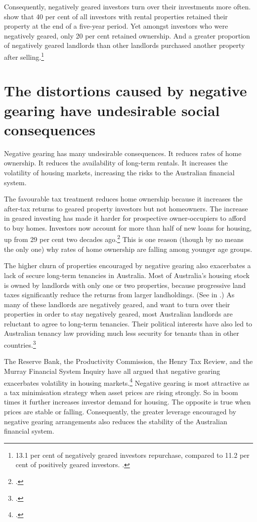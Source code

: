 Consequently, negatively geared investors turn over their investments more often. 
\textcite[][28]{WoodOng2010} show that 40 per cent of all investors with rental properties retained their property at the end of a five-year period.  
Yet amongst investors who were negatively geared, only 20 per cent retained ownership. And a greater proportion of negatively geared landlords than other landlords purchased another property after selling.\footnote{13.1 per cent of negatively geared investors repurchase, compared to 11.2 per cent of positively geared investors. \textcite[][28]{WoodOng2010}.}  

\section{The distortions caused by negative gearing have undesirable social consequences}
Negative gearing has many undesirable consequences. It reduces rates of home ownership. 
It reduces the availability of long-term rentals. It increases the volatility of housing markets, increasing the risks to the Australian financial system. 

The favourable tax treatment reduces home ownership because it increases the after-tax returns to geared property investors but not homeowners. 
The increase in geared investing has made it harder for prospective owner-occupiers to afford to buy homes. 
Investors now account for more than half of new loans for housing, up from 29 per cent two decades ago.\footcite[][Table~8]{ABS2016a}  
This is one reason (though by no means the only one) why rates of home ownership are falling among younger age groups. 

The higher churn of properties encouraged by negative gearing also exacerbates a lack of secure long-term tenancies in Australia. 
Most of Australia’s housing stock is owned by landlords with only one or two properties, because progressive land taxes significantly reduce the returns from larger landholdings. (See  in .) 
As many of these landlords are negatively geared, and want to turn over their properties in order to stay negatively geared, most Australian landlords are reluctant to agree to long-term tenancies. 
Their political interests have also led to Australian tenancy law providing much less security for tenants than in other countries.\footcite[][19--21]{KellyMaresHarrisonEtAl2013} 

The Reserve Bank, the Productivity Commission, the Henry Tax Review, and the Murray Financial System Inquiry have all argued that negative gearing exacerbates volatility in housing markets.\footcites[][88]{RBA2014FinancialSystemInquirySubmission}[][45]{RBA2014SubmissionAffordableHousingInquiry}[][75 and 131]{ProductivityCommission2004FirstHomeOwnership}[][70 and 418]{HenryTaxReview2010}[][278]{FinancialSystemsInquiry2015}
Negative gearing is most attractive as a tax minimisation strategy when asset prices are rising strongly. 
So in boom times it further increases investor demand for housing. 
The opposite is true when prices are stable or falling. 
Consequently, the greater leverage encouraged by negative gearing arrangements also reduces the stability of the Australian financial system.

